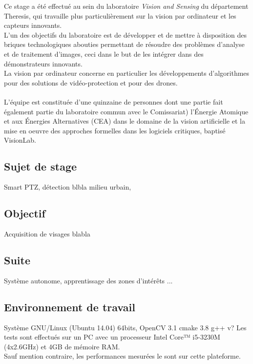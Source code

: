 \documentclass[12pt]{article}
\begin{document}
Ce stage a été effectué au sein du laboratoire \textit{Vision and Sensing} du département Theresis, qui travaille plus particulièrement sur la vision par ordinateur et les capteurs innovants.\\
L'un des objectifs du laboratoire est de développer et de mettre à disposition des briques technologiques abouties permettant de résoudre des problèmes d'analyse et de traitement d'images, ceci dans le but de les intégrer dans des démonstrateurs innovants.\\
La vision par ordinateur concerne en particulier les développements d'algorithmes pour des solutions de vidéo-protection et pour des drones. \\
\\
L'équipe est constituée d'une quinzaine de personnes dont une partie fait également partie du laboratoire commun avec le Comissariat) l'Énergie Atomique et aux Énergies Alternatives (CEA) dans le domaine de la vision artificielle et la mise en oeuvre des approches formelles dans les logiciels critiques, baptisé VisionLab.
\subsection{Sujet de stage}
Smart PTZ, détection blbla milieu urbain,
\subsection{Objectif}
Acquisition de visages blabla
\subsection{Suite}
Système autonome, apprentissage des zones d'intérêts ...
\subsection{Environnement de travail}
Système GNU/Linux (Ubuntu 14.04) 64bits, 
OpenCV 3.1
cmake 3.8
g++ v?
Les tests sont effectués sur un PC avec un processeur Intel Core™ i5-3230M (4x2.6GHz) et 4GB de mémoire RAM.\\
Sauf mention contraire, les performances mesurées le sont sur cette plateforme.
\end{document}
